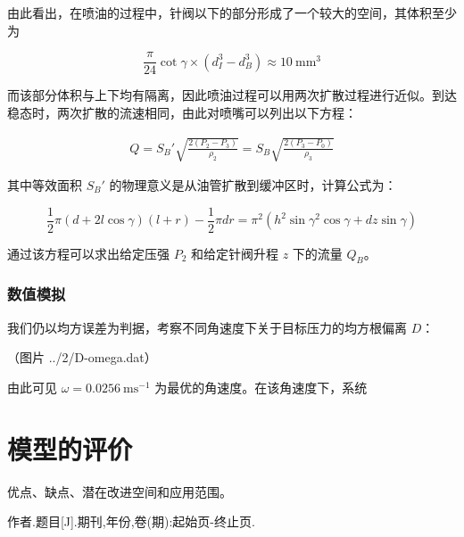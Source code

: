 \documentclass[18pt]{ctexart}
\newcommand{\vol}{~\mathrm{mm^3}}
\newcommand{\vel}{~\mathrm{ms^{-1}}}
\begin{document}
由此看出，在喷油的过程中，针阀以下的部分形成了一个较大的空间，其体积至少为

$$
\frac{\pi}{24}\cot\gamma\times\left(d_I^3-d_B^3\right)\approx 10\vol
$$

而该部分体积与上下均有隔离，因此喷油过程可以用两次扩散过程进行近似。到达稳态时，两次扩散的流速相同，由此对喷嘴可以列出以下方程：

$$
\begin{aligned}
Q=S_B'\sqrt{\frac{2(P_2-P_3)}{\rho_2}}=S_B\sqrt{\frac{2(P_3-P_0)}{\rho_3}}
\end{aligned}
$$

其中等效面积 $S_B'$ 的物理意义是从油管扩散到缓冲区时，计算公式为：

$$
\frac{1}{2}\pi{}(d+2l\cos{\gamma})(l+r)-\frac{1}{2}\pi{}dr = \pi^2(h^2\sin{\gamma}^2\cos{\gamma}+dz\sin{\gamma})
$$

通过该方程可以求出给定压强 $P_2$ 和给定针阀升程 $z$ 下的流量 $Q_B$。

\subsubsection{数值模拟}

我们仍以均方误差为判据，考察不同角速度下关于目标压力的均方根偏离 $D$：

（图片 ../2/D-omega.dat）

由此可见 $\omega=0.0256\vel$ 为最优的角速度。在该角速度下，系统

\newpage
\section{模型的评价}
优点、缺点、潜在改进空间和应用范围。
\newpage
\begin{thebibliography}{100}
 作者.题目[J].期刊,年份,卷(期):起始页-终止页.
\end{thebibliography}
\newpage
\appendix
\end{document}
